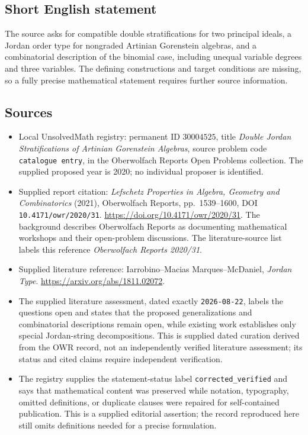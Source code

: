 \documentclass[11pt]{article}
\begin{document}
\subsection{Short English statement}
The source asks for compatible double stratifications for two principal ideals, a Jordan order type for nongraded Artinian Gorenstein algebras, and a combinatorial description of the binomial case, including unequal variable degrees and three variables. The defining constructions and target conditions are missing, so a fully precise mathematical statement requires further source information.
\subsection{Sources}
\begin{itemize}
\item Local UnsolvedMath registry: permanent ID \(30004525\), title \emph{Double Jordan Stratifications of Artinian Gorenstein Algebras}, source problem code \texttt{catalogue entry}, in the Oberwolfach Reports Open Problems collection. The supplied proposed year is 2020; no individual proposer is identified.
\item Supplied report citation: \emph{Lefschetz Properties in Algebra, Geometry and Combinatorics} (2021), Oberwolfach Reports, pp.\ 1539--1600, DOI \texttt{10.4171/owr/2020/31}. \url{https://doi.org/10.4171/owr/2020/31}. The background describes Oberwolfach Reports as documenting mathematical workshops and their open-problem discussions. The literature-source list labels this reference \emph{Oberwolfach Reports 2020/31}.
\item Supplied literature reference: Iarrobino--Macias Marques--McDaniel, \emph{Jordan Type}. \url{https://arxiv.org/abs/1811.02072}.
\item The supplied literature assessment, dated exactly \texttt{2026-08-22}, labels the questions open and states that the proposed generalizations and combinatorial descriptions remain open, while existing work establishes only special Jordan-string decompositions. This is supplied dated curation derived from the OWR record, not an independently verified literature assessment; its status and cited claims require independent verification.
\item The registry supplies the statement-status label \texttt{corrected\_verified} and says that mathematical content was preserved while notation, typography, omitted definitions, or duplicate clauses were repaired for self-contained publication. This is a supplied editorial assertion; the record reproduced here still omits definitions needed for a precise formulation.
\end{itemize}
\end{document}
